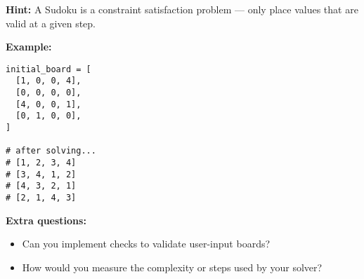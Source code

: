 \documentclass[12pt,a4paper]{article}
\begin{document}
\textbf{Hint:} A Sudoku is a constraint satisfaction problem — only place values that are valid at a given step.

\textbf{Example:}
\begin{lstlisting}
initial_board = [
  [1, 0, 0, 4],
  [0, 0, 0, 0],
  [4, 0, 0, 1],
  [0, 1, 0, 0],
]

# after solving...
# [1, 2, 3, 4]
# [3, 4, 1, 2]
# [4, 3, 2, 1]
# [2, 1, 4, 3]
\end{lstlisting}

\textbf{Extra questions:}
\begin{itemize}
  \item Can you implement checks to validate user-input boards?
  \item How would you measure the complexity or steps used by your solver?
\end{itemize}
\end{document}
